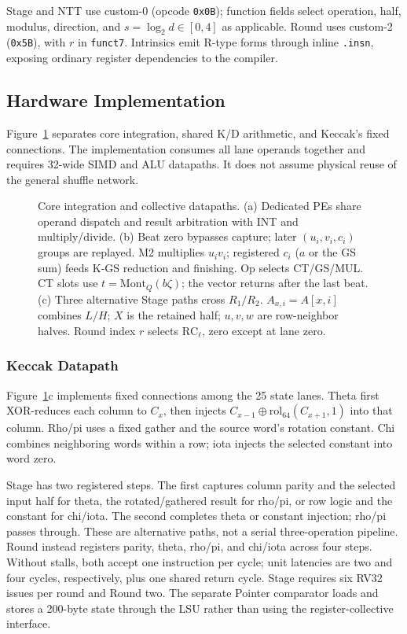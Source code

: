 \documentclass[conference,letterpaper]{IEEEtran}
\newcommand{\code}[1]{\texttt{#1}}
\begin{document}
Stage and NTT use custom-0 (opcode \code{0x0B}); function fields select
operation, half, modulus, direction, and $s=\log_2d\in[0,4]$ as applicable.
Round uses custom-2 (\code{0x5B}), with $r$ in \code{funct7}. Intrinsics emit
R-type forms through inline \code{.insn}, exposing ordinary register
dependencies to the compiler.

\subsection{Hardware Implementation}
Figure~\ref{fig:architecture} separates core integration, shared K/D
arithmetic, and Keccak's fixed connections. The implementation consumes all
lane operands together and requires 32-wide SIMD and ALU datapaths. It does
not assume physical reuse of the general shuffle network.

\begin{figure}[t]
\centering
\caption{Core integration and collective datapaths. (a) Dedicated PEs share
operand dispatch and result arbitration with INT and multiply/divide.
(b) Beat zero bypasses capture; later $(u_i,v_i,c_i)$ groups are replayed.
M2 multiplies $u_i v_i$; registered $c_i$ ($a$ or the GS sum) feeds K-GS
reduction and finishing. Op selects CT/GS/MUL. CT slots use
$t=\mathrm{Mont}_Q(b\zeta)$; the vector returns after the last beat.
(c) Three alternative Stage paths cross $R_1/R_2$.
$A_{x,i}=A[x,i]$ combines $L/H$; $X$ is the retained half;
$u,v,w$ are row-neighbor halves. Round index $r$ selects
$\mathrm{RC}_{\ell}$, zero except at lane zero.}
\label{fig:architecture}
\end{figure}

\subsubsection{Keccak Datapath}
Figure~\ref{fig:architecture}c implements fixed connections among the 25
state lanes. Theta first XOR-reduces each column to $C_x$, then injects
$C_{x-1}\oplus\mathrm{rol}_{64}(C_{x+1},1)$ into that column. Rho/pi uses a
fixed gather and the source word's rotation constant. Chi combines neighboring
words within a row; iota injects the selected constant into word zero.

Stage has two registered steps. The first captures column parity and the
selected input half for theta, the rotated/gathered result for rho/pi, or row
logic and the constant for chi/iota. The second completes theta or constant
injection; rho/pi passes through. These are alternative paths, not a serial
three-operation pipeline. Round instead registers parity, theta, rho/pi, and
chi/iota across four steps. Without stalls, both accept one instruction per
cycle; unit latencies are two and four cycles, respectively, plus one shared
return cycle. Stage requires six RV32 issues per round and Round two.
The separate Pointer comparator loads and stores a 200-byte state through the
LSU rather than using the register-collective interface.
\end{document}
